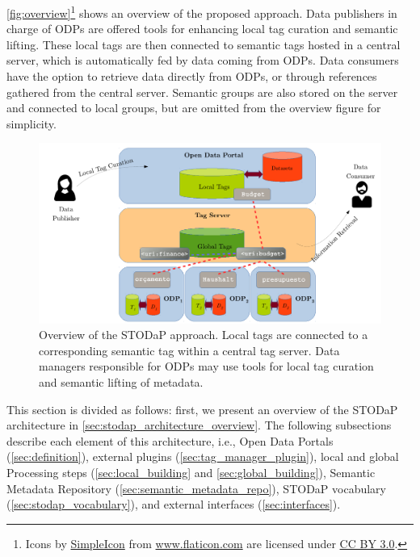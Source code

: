 \autoref{fig:overview}\footnote{Icons by \href{http://www.flaticon.com/authors/simpleicon}{SimpleIcon} from \href{http://www.flaticon.com}{www.flaticon.com} are licensed under \href{http://creativecommons.org/licenses/by/3.0/}{CC BY 3.0}.} shows an overview of the proposed approach.
Data publishers in charge of ODPs are offered tools for enhancing local tag curation and semantic lifting.
These local tags are then connected to semantic tags hosted in a central server, which is automatically fed by data coming from ODPs.
Data consumers have the option to retrieve data directly from ODPs, or through references gathered from the central server.
Semantic groups are also stored on the server and connected to local groups, but are omitted from the overview figure for simplicity.

\begin{figure}[t]
\begin{center}
\includegraphics[width=\columnwidth]{images/overview.pdf}
\caption[Overview of the STODaP approach.]{Overview of the STODaP approach. Local tags are connected to a corresponding semantic tag within a central tag server. 
Data managers responsible for ODPs may use tools for local tag curation and semantic lifting of metadata.}
\label{fig:overview}
\end{center}
\end{figure}

This section is divided as follows: first, we present an overview of the STODaP architecture in \autoref{sec:stodap_architecture_overview}.
The following subsections describe each element of this architecture, i.e., Open Data Portals (\autoref{sec:definition}), external plugins (\autoref{sec:tag_manager_plugin}), local and global Processing steps (\autoref{sec:local_building} and \autoref{sec:global_building}), Semantic Metadata Repository (\autoref{sec:semantic_metadata_repo}),  STODaP vocabulary (\autoref{sec:stodap_vocabulary}), and external interfaces (\autoref{sec:interfaces}).

